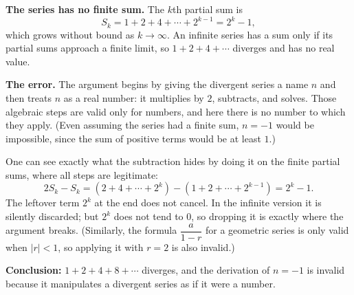 \textbf{The series has no finite sum.} The $k$th partial sum is
\[S_k=1+2+4+\cdots+2^{k-1}=2^k-1,\]
which grows without bound as $k\to\infty$. An infinite series has a sum only if its partial sums approach a finite limit, so $1+2+4+\cdots$ diverges and has no real value.

\textbf{The error.} The argument begins by giving the divergent series a name $n$ and then treats $n$ as a real number: it multiplies by $2$, subtracts, and solves. Those algebraic steps are valid only for numbers, and here there is no number to which they apply. (Even assuming the series had a finite sum, $n=-1$ would be impossible, since the sum of positive terms would be at least $1$.)

One can see exactly what the subtraction hides by doing it on the finite partial sums, where all steps are legitimate:
\[2S_k-S_k=\left(2+4+\cdots+2^{k}\right)-\left(1+2+\cdots+2^{k-1}\right)=2^k-1.\]
The leftover term $2^k$ at the end does not cancel. In the infinite version it is silently discarded; but $2^k$ does not tend to $0$, so dropping it is exactly where the argument breaks. (Similarly, the formula $\dfrac{a}{1-r}$ for a geometric series is only valid when $|r|<1$, so applying it with $r=2$ is also invalid.)

\textbf{Conclusion:} $1+2+4+8+\cdots$ diverges, and the derivation of $n=-1$ is invalid because it manipulates a divergent series as if it were a number.
